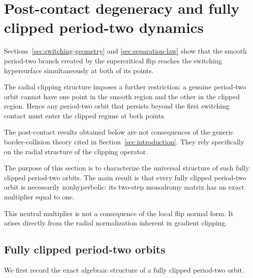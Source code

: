 \section{Post-contact degeneracy and fully clipped period-two dynamics}
\label{sec:post-contact}

Sections~\ref{sec:switching-geometry} and
\ref{sec:separation-law} show that the smooth period-two branch
created by the supercritical flip reaches the switching hypersurface
simultaneously at both of its points.

The radial clipping structure imposes a further restriction:
a genuine period-two orbit cannot have one point in the smooth region
and the other in the clipped region. Hence any period-two orbit that
persists beyond the first switching contact must enter the clipped
regime at both points.

The post-contact results obtained below are not consequences of the
generic border-collision theory cited in
Section~\ref{sec:introduction}.  They rely specifically on the
radial structure of the clipping operator.

The purpose of this section is to characterize the universal
structure of such fully clipped period-two orbits.  The main result
is that every fully clipped period-two orbit is necessarily
nonhyperbolic: its two-step monodromy matrix has an exact multiplier
equal to one.

This neutral multiplier is not a consequence of the local flip
normal form.  It arises directly from the radial normalization
inherent in gradient clipping.

\subsection{Fully clipped period-two orbits}
\label{subsec:fully-clipped-two-cycles}

We first record the exact algebraic structure of a fully clipped
period-two orbit.

